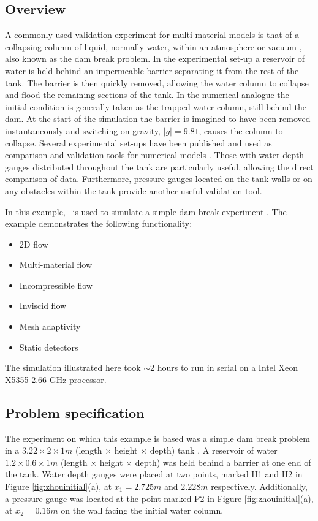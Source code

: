 \subsection{Overview}
A commonly used validation experiment for multi-material models is that of a collapsing column of liquid, normally water, within an atmosphere or vacuum \citep{lakehal_interface_2002}, also known as the dam break problem.  In the experimental set-up a reservoir of water is held behind an impermeable barrier separating it from the rest of the tank.  The barrier is then quickly removed, allowing the water column to collapse and flood the remaining sections of the tank.  In the numerical analogue the initial condition is generally taken as the trapped water column, still behind the dam.  At the start of the simulation the barrier is imagined to have been removed instantaneously and switching on gravity, $|g| = 9.81$, causes the column to collapse.   Several experimental set-ups have been published and used as comparison and validation tools for numerical models \citep{martin_part_1952, greaves_simulation_2006}.  Those with water depth gauges distributed throughout the tank are particularly useful, allowing the 
direct comparison of data.  Furthermore, pressure gauges located on the tank walls or on any obstacles within the tank provide another useful validation tool.

In this example, \fluidity\ is used to simulate a simple dam break experiment \citep{zhou_nonlinear_1999}.  The example demonstrates the following functionality:

\begin{itemize}
\item 2D flow
\item Multi-material flow
\item Incompressible flow
\item Inviscid flow
\item Mesh adaptivity
\item Static detectors
\end{itemize}

The simulation illustrated here took $\sim$2 hours to run in serial on a Intel Xeon X5355 2.66 GHz processor.

\subsection{Problem specification}
The experiment on which this example is based was a simple dam break problem in a $3.22\times2\times1m$ (length $\times$ height $\times$ depth) tank \citep{zhou_nonlinear_1999}.  A reservoir of water $1.2\times0.6\times1m$ (length $\times$ height $\times$ depth) was held behind a barrier at one end of the tank.  Water depth gauges were placed at two points, marked H1 and H2 in Figure \ref{fig:zhouinitial}(a), at $x_1 = 2.725m$ and $2.228m$ respectively.  Additionally, a pressure gauge was located at the point marked P2 in Figure \ref{fig:zhouinitial}(a), at $x_2=0.16m$ on the wall facing the initial water column.

